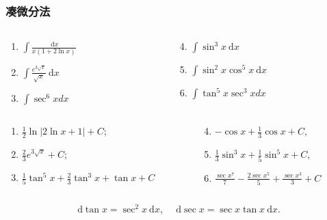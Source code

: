 \documentclass[
10pt,
aspectratio=43,
]{beamer}
\begin{document}
\begin{frame}
	\frametitle{凑微分法}
	\everymath{\displaystyle}
	\begin{block}{}
		\begin{columns}[onlytextwidth]
			\begin{column}{0.5\textwidth}
				\begin{enumerate}
					\item $\int \frac{\mathrm{~d} x}{x(1+2 \ln x)}$
					\item $\int \frac{e^{3 \sqrt{x}}}{\sqrt{x}} \mathrm{~d} x$
					\item $\int \sec ^6 x d x$
				\end{enumerate}
			\end{column}
			\begin{column}{0.5\textwidth}
				\begin{enumerate}
					\setcounter{enumi}{3}
					\item $\int \sin ^3 x \mathrm{~d} x$
					\item $\int \sin ^2 x \cos ^5 x \mathrm{~d} x$
					\item $\int \tan ^5 x \sec ^3 x d x$
				\end{enumerate}
			\end{column}
		\end{columns}
	\end{block}
	\pause
	\begin{exampleblock}{}
		\begin{columns}[onlytextwidth]
			\begin{column}{0.5\textwidth}
				\begin{enumerate}
					\item $\frac12\ln\left|2\ln x+1\right|+C$;
					      \pause
					\item $\frac{2}{3}e^{3\sqrt{x}}+C$;
					      \pause
					\item $\frac15\tan^5x+\frac23\tan^3x+\tan x+C$
				\end{enumerate}
			\end{column}
			\begin{column}{0.5\textwidth}
				\begin{enumerate}
					\setcounter{enumi}{3}
					\pause
					\item $-\cos x +\frac{1}{3}\cos x+C$,
					      \pause
					\item $\frac{1}{3}\sin^3 x +\frac{1}{5}\sin^5 x +C$,
					      \pause
					\item $\frac{\sec x^7}{7}-\frac{2 \sec x^5}{5}+\frac{\sec x^3}{3}+C$
				\end{enumerate}
			\end{column}
		\end{columns}
	\end{exampleblock}
	$$
		\mathrm{~d}\tan x = \sec^2 x\mathrm{~d}x,\quad \mathrm{~d}\sec x = \sec x\tan x \mathrm{~d}x.
	$$
\end{frame}
\end{document}

